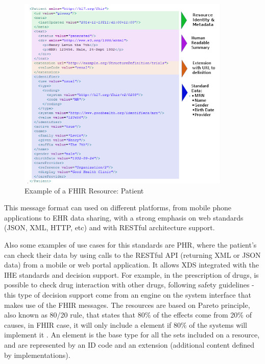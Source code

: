 \documentclass[mim_thesis.tex]{subfiles}
\begin{document}
\begin{figure}[H]
	\centering
    \includegraphics[width=0.9\textwidth]{img/fhir_patient.PNG}
	\caption{Example of a FHIR Resource: Patient \citep{FHIR2017}}
	\label{fig:fhir_patient}
\end{figure}

This message format can used on different platforms, from mobile phone applications to EHR data sharing, with a strong emphasis on web standards (JSON, XML, HTTP, etc) and with RESTful architecture support.
  
Also some examples of use cases for this standards are PHR, where the patient’s can check their data by using calls to the RESTful API (returning XML or JSON data) from a mobile or web portal application. It allows \ac{XDS} integrated with the IHE standards and decision support. For example, in the prescription of drugs, is possible to check drug interaction with other drugs, following safety guidelines - this type of decision support come from an engine on the system interface that makes use of the FHIR messages. The resources are based on Pareto principle, also known as 80/20 rule, that states that 80\% of the effects come from 20\% of causes, in FHIR case, it will only include a element if 80\% of the systems will implement it \citep{hl7fhir2017}. An element is the base type for all the sets included on a resource, and are represented by an ID code and an extension (additional content defined by implementations).   
\end{document}
